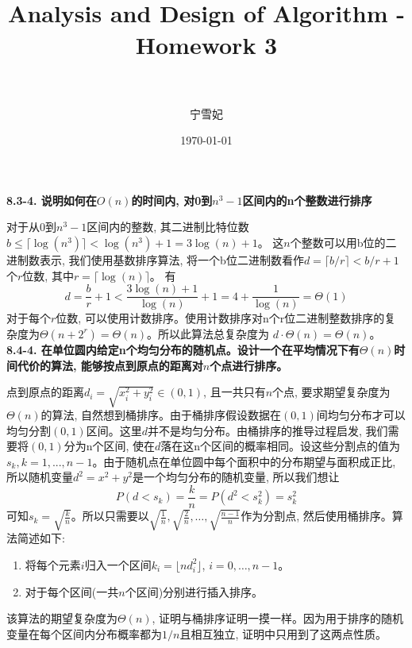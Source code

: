 \documentclass[paper=a4, fontsize=11pt]{scrartcl} %
\title{	
\normalfont \normalsize 
\horrule{0.5pt} \\[0.4cm] %
\huge Analysis and Design of Algorithm - Homework 3\\ %
\horrule{2pt} \\[0.5cm] %
}
\author{宁雪妃} %
\date{\normalsize\today} %
\numberwithin{equation}{section} %
\numberwithin{figure}{section} %
\numberwithin{table}{section} %
\begin{document}
\maketitle %



\textbf{8.3-4. 说明如何在$O(n)$的时间内, 对0到$n^3 - 1$区间内的n个整数进行排序}

对于从0到$n^3 - 1$区间内的整数, 其二进制比特位数 $b \leq \lceil \log(n^3) \rceil < \log(n^3) + 1 = 3\log(n) + 1$。
这$n$个整数可以用b位的二进制数表示, 我们使用基数排序算法, 将一个b位二进制数看作$d = \lceil b/r \rceil < b/r + 1$个$r$位数, 其中$r = \lceil \log(n) \rceil$。
有
\[
d = \frac{b}{r} + 1 < \frac{3\log(n) + 1}{\log(n)} + 1 = 4 + \frac{1}{\log(n)} = \Theta(1)
\]
对于每个$r$位数, 可以使用计数排序。使用计数排序对n个r位二进制整数排序的复杂度为$\Theta(n + 2^r) = \Theta(n)$。所以此算法总复杂度为 $d \cdot \Theta(n) = \Theta(n)$。
\\[4ex]

\textbf{8.4-4. 在单位圆内给定n个均匀分布的随机点。设计一个在平均情况下有$\Theta(n)$时间代价的算法, 能够按点到原点的距离对$n$个点进行排序。}

点到原点的距离$d_i = \sqrt{x_i^2 + y_i^2} \in (0, 1)$, 且一共只有$n$个点, 要求期望复杂度为$\Theta(n)$的算法, 自然想到桶排序。由于桶排序假设数据在$(0, 1)$间均匀分布才可以均匀分割$(0, 1)$区间。这里$d$并不是均匀分布。由桶排序的推导过程启发, 我们需要将$(0, 1)$分为n个区间, 使在$d$落在这n个区间的概率相同。设这些分割点的值为$s_k, k = 1,...,n-1$。由于随机点在单位圆中每个面积中的分布期望与面积成正比, 所以随机变量$d^2 = x^2 + y^2$是一个均匀分布的随机变量, 所以我们想让
\[
P(d < s_k) = \frac{k}{n} = P(d^2 < s_k^2) = s_k^2
\]
可知$s_k = \sqrt{\frac{k}{n}}$。所以只需要以$\sqrt{\frac{1}{n}}, \sqrt{\frac{2}{n}}, \dots, \sqrt{\frac{n-1}{n}}$作为分割点, 然后使用桶排序。算法简述如下:
\begin{enumerate}
\item 将每个元素$i$归入一个区间$k_i = \lfloor nd_i^2 \rfloor$, $i = 0, \dots, n-1$。
\item 对于每个区间(一共$n$个区间)分别进行插入排序。
\end{enumerate}
  该算法的期望复杂度为$\Theta(n)$, 证明与桶排序证明一摸一样。因为用于排序的随机变量在每个区间内分布概率都为$1/n$且相互独立, 证明中只用到了这两点性质。
\end{document}

